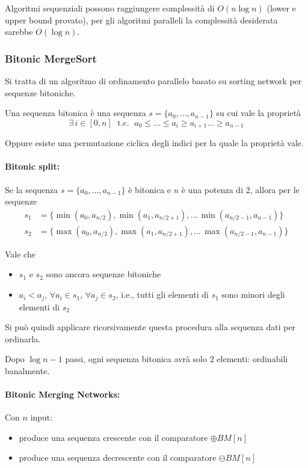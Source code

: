 Algoritmi sequenziali possono raggiungere complessità di $O (n \log n)$ (lower e upper bound provato), per gli algoritmi paralleli la complessità desiderata sarebbe $O (\log n)$.

\subsubsection{Bitonic MergeSort}

Si tratta di un algoritmo di ordinamento parallelo basato su sorting network per sequenze bitoniche.

Una sequenza bitonica è una sequenza $s = \{a_0, \dots, a_{n-1}\}$ su cui vale la proprietà
$$ \exists \, i \in [0,n] \; \text{ t.c. } \; a_0 \leq \dots \leq a_i \geq a_{i+1} \dots \geq a_{n-1} $$

Oppure esiste una permutazione ciclica degli indici per la quale la proprietà vale. 

\paragraph{Bitonic split:} Se la sequenza $s = \{a_0, \dots, a_{n-1}\}$ è bitonica e $n$ è una potenza di 2, allora per le sequenze
\begin{align*}
    s_1 & = \{ \min (a_0, a_{n/2}), \min (a_1, a_{n/2 + 1}), \dots \, \min (a_{n/2 - 1}, a_{n-1}) \} \\
    s_2 & = \{ \max (a_0, a_{n/2}), \max (a_1, a_{n/2 + 1}), \dots \, \max (a_{n/2 - 1}, a_{n-1}) \}
\end{align*}

Vale che 
\begin{itemize}
    \item $s_1$ e $s_2$ sono ancora sequenze bitoniche
    \item $a_i < a_j$, $\forall a_i \in s_1$, $\forall a_j \in s_2$, i.e., tutti gli elementi di $s_1$ sono minori degli elementi di $s_2$
\end{itemize}

Si può quindi applicare ricorsivamente questa procedura alla sequenza dati per ordinarla.

Dopo $\log n - 1$ passi, ogni sequenza bitonica avrà solo 2 elementi: ordinabili banalmente.

\paragraph{Bitonic Merging Networks:} Con $n$ input: 
\begin{itemize}
    \item produce una sequenza crescente con il comparatore $\oplus BM [n]$
    \item produce una sequenza decrescente con il comparatore $\ominus BM [n]$
\end{itemize}

